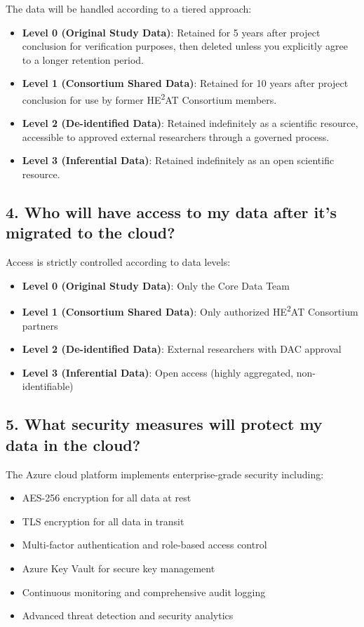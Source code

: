 \documentclass[12pt,letterpaper]{article}
\begin{document}
The data will be handled according to a tiered approach:

\begin{itemize}
\item \textbf{Level 0 (Original Study Data)}: Retained for 5 years after project conclusion for verification purposes, then deleted unless you explicitly agree to a longer retention period.

\item \textbf{Level 1 (Consortium Shared Data)}: Retained for 10 years after project conclusion for use by former HE\textsuperscript{2}AT Consortium members.

\item \textbf{Level 2 (De-identified Data)}: Retained indefinitely as a scientific resource, accessible to approved external researchers through a governed process.

\item \textbf{Level 3 (Inferential Data)}: Retained indefinitely as an open scientific resource.
\end{itemize}

\subsection*{4. Who will have access to my data after it's migrated to the cloud?}

Access is strictly controlled according to data levels:

\begin{itemize}
\item \textbf{Level 0 (Original Study Data)}: Only the Core Data Team
\item \textbf{Level 1 (Consortium Shared Data)}: Only authorized HE\textsuperscript{2}AT Consortium partners
\item \textbf{Level 2 (De-identified Data)}: External researchers with DAC approval
\item \textbf{Level 3 (Inferential Data)}: Open access (highly aggregated, non-identifiable)
\end{itemize}

\subsection*{5. What security measures will protect my data in the cloud?}

The Azure cloud platform implements enterprise-grade security including:
\begin{itemize}
\item AES-256 encryption for all data at rest
\item TLS encryption for all data in transit
\item Multi-factor authentication and role-based access control
\item Azure Key Vault for secure key management
\item Continuous monitoring and comprehensive audit logging
\item Advanced threat detection and security analytics
\end{itemize}
\end{document}

